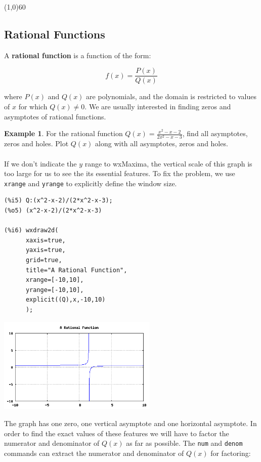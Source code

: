 \documentclass[10.5pt,twoside]{report}
\theoremstyle{definition}
\newtheorem{exmp}{Example}[section]
\begin{document}
\line(1,0){60}
\linethickness{0.5mm}

\subsection{Rational Functions}

A \textbf{rational function} is a function of the form:

$$f(x)=\frac{P(x)}{Q(x)}$$

where $P(x)$ and $Q(x)$ are polynomials, and the domain is restricted to values of $x$ for which $Q(x){\neq}{0}$.  We are usually interested in finding zeros and asymptotes of rational functions.

\begin{exmp}
For the rational function $Q(x)=\frac{x^{2}-x-2}{2x^{2}-x-3}$, find all asymptotes, zeros and holes. Plot $Q(x)$ along with all asymptotes, zeros and holes. \\
${}$\\
If we don't indicate the $y$ range to wxMaxima, the vertical scale of this graph is too large for us to see the its essential features.  To fix the problem, we use \verb|xrange| and \verb|yrange| to explicitly define the window size.


\begin{verbatim}
(%i5) Q:(x^2-x-2)/(2*x^2-x-3);
(%o5) (x^2-x-2)/(2*x^2-x-3)

(%i6) wxdraw2d(
      xaxis=true,
      yaxis=true,
      grid=true,
      title="A Rational Function",
      xrange=[-10,10],
      yrange=[-10,10],
      explicit((Q),x,-10,10)
      );
\end{verbatim}

\includegraphics[width=3in]{example_1_1_2_1}



The graph has one zero, one vertical asymptote and one horizontal asymptote.  In order to find the exact values of these features we will have to factor the numerator and denominator of $Q(x)$ as far as possible.  The \verb|num| and \verb|denom| commands can extract the numerator and denominator of $Q(x)$ for factoring:


\end{exmp}
\end{document}
